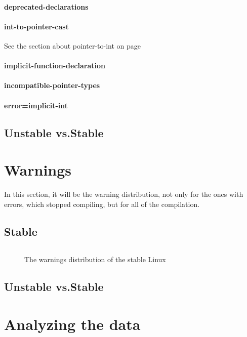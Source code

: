 \documentclass[a4paper,11pt]{report}
\newcommand{\figa}{
    \begin{figure}[!htpb]
    \centering
}
\newcommand{\figb}[2]{
    \caption{#1}
    \label{#2}
    \end{figure}
}
\begin{document}
    \paragraph{deprecated-declarations}
    \paragraph{int-to-pointer-cast}

See the section about pointer-to-int on page \pageref{par:pointertoint}
    \paragraph{implicit-function-declaration}
    \paragraph{incompatible-pointer-types}
    \paragraph{error=implicit-int}


    \subsection{Unstable vs.Stable}


    \section{Warnings}

In this section, it will be the warning distribution, not only for the ones 
with errors, which stopped compiling, but for all of the compilation.

    \subsection{Stable}

\figa
    \begin{tabular}{c|c}

    \end{tabular}
\figb{The warnings distribution of the stable Linux}{tab:stablewarn}

    \subsection{Unstable vs.Stable}

\section{Analyzing the data}
\end{document}
